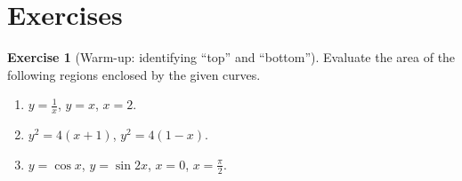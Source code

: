 \documentclass[11pt]{article}
\theoremstyle{definition}
\newtheorem{exercise}{Exercise}[section]
\begin{document}

\section{Exercises}

\begin{exercise}[Warm-up: identifying ``top'' and ``bottom'']
Evaluate the area of the following regions enclosed by the given curves.
\begin{enumerate}
  \item $y=\frac{1}{x}$, $y=x$, $x=2$.
  \item $y^2=4(x+1)$, $y^2=4(1-x)$.
  \item $y=\cos x$, $y=\sin 2x$, $x=0$, $x=\frac{\pi}{2}$.
\end{enumerate}
\end{exercise}
\end{document}
